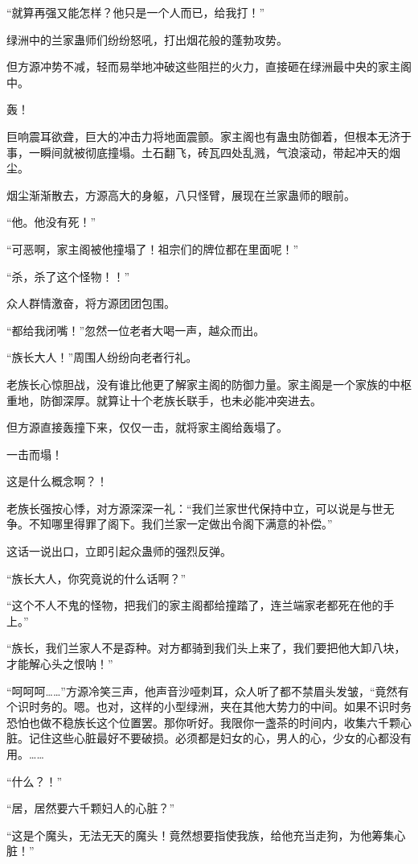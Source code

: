 \begin{this_body}
“就算再强又能怎样？他只是一个人而已，给我打！”

绿洲中的兰家蛊师们纷纷怒吼，打出烟花般的蓬勃攻势。

但方源冲势不减，轻而易举地冲破这些阻拦的火力，直接砸在绿洲最中央的家主阁中。

轰！

巨响震耳欲聋，巨大的冲击力将地面震颤。家主阁也有蛊虫防御着，但根本无济于事，一瞬间就被彻底撞塌。土石翻飞，砖瓦四处乱溅，气浪滚动，带起冲天的烟尘。

烟尘渐渐散去，方源高大的身躯，八只怪臂，展现在兰家蛊师的眼前。

“他。他没有死！”

“可恶啊，家主阁被他撞塌了！祖宗们的牌位都在里面呢！”

“杀，杀了这个怪物！！”

众人群情激奋，将方源团团包围。

“都给我闭嘴！”忽然一位老者大喝一声，越众而出。

“族长大人！”周围人纷纷向老者行礼。

老族长心惊胆战，没有谁比他更了解家主阁的防御力量。家主阁是一个家族的中枢重地，防御深厚。就算让十个老族长联手，也未必能冲突进去。

但方源直接轰撞下来，仅仅一击，就将家主阁给轰塌了。

一击而塌！

这是什么概念啊？！

老族长强按心悸，对方源深深一礼：“我们兰家世代保持中立，可以说是与世无争。不知哪里得罪了阁下。我们兰家一定做出令阁下满意的补偿。”

这话一说出口，立即引起众蛊师的强烈反弹。

“族长大人，你究竟说的什么话啊？”

“这个不人不鬼的怪物，把我们的家主阁都给撞踏了，连兰端家老都死在他的手上。”

“族长，我们兰家人不是孬种。对方都骑到我们头上来了，我们要把他大卸八块，才能解心头之恨呐！”

“呵呵呵……”方源冷笑三声，他声音沙哑刺耳，众人听了都不禁眉头发皱，“竟然有个识时务的。嗯。也对，这样的小型绿洲，夹在其他大势力的中间。如果不识时务恐怕也做不稳族长这个位置罢。那你听好。我限你一盏茶的时间内，收集六千颗心脏。记住这些心脏最好不要破损。必须都是妇女的心，男人的心，少女的心都没有用。……

“什么？！”

“居，居然要六千颗妇人的心脏？”

“这是个魔头，无法无天的魔头！竟然想要指使我族，给他充当走狗，为他筹集心脏！”


\end{this_body}
